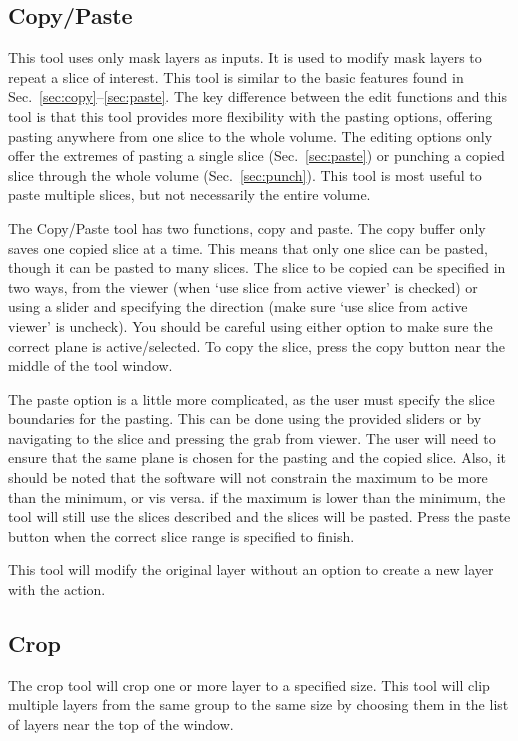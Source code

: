 \documentclass[fleqn,11pt,openany]{book}
\begin{document}
\subsection{Copy/Paste}

This tool uses only mask layers as inputs.  It is used to modify mask layers to repeat a slice of interest.  This tool is similar to the basic features found in Sec.~\ref{sec:copy}--\ref{sec:paste}.  The key difference between the edit functions and this tool is that this tool provides more flexibility with the pasting options, offering pasting anywhere from one slice to the whole volume.  The editing options only offer the extremes of pasting a single slice (Sec.~\ref{sec:paste}) or punching a copied slice through the whole volume (Sec.~\ref{sec:punch}).  This tool is most useful to paste multiple slices, but not necessarily the entire volume.  

The Copy/Paste tool has two functions, copy and paste.  The copy buffer only saves one copied slice at a time.  This means that only one slice can be pasted, though it can be pasted to many slices.  The slice to be copied can be specified in two ways, from the viewer (when `use slice from active viewer' is checked) or using a slider and specifying the direction (make sure `use slice from active viewer' is uncheck).  You should be careful using either option to make sure the correct plane is active/selected.  To copy the slice, press the copy button near the middle of the tool window.  

The paste option is a little more complicated, as the user must specify the slice boundaries for the pasting.  This can be done using the provided sliders or by navigating to the slice and pressing the grab from viewer.  The user will need to ensure that the same plane is chosen for the pasting and the copied slice.  Also, it should be noted that the software will not constrain the maximum to be more than the minimum, or vis versa.  if the maximum is lower than the minimum, the tool will still use the slices described and the slices will be pasted.  Press the paste button when the correct slice range is specified to finish.  

This tool will modify the original layer without an option to create a new layer with the action.  

\subsection{Crop}

The crop tool will crop one or more layer to a specified size.  This tool will clip multiple layers from the same group to the same size  by choosing them in the list of layers near the top of the window.  
\end{document}

